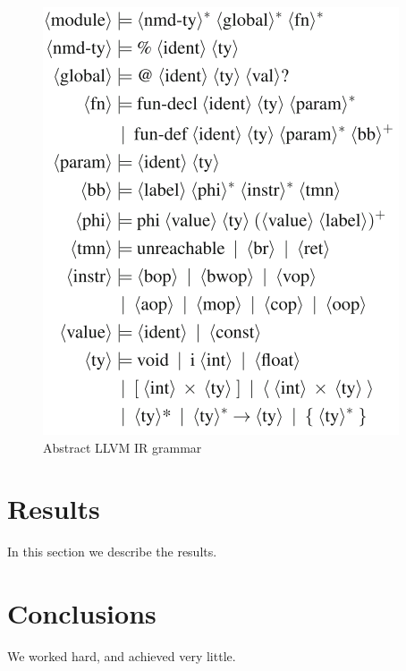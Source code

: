 \documentclass[14pt]{article}
\begin{document}
\begin{figure}[htb!]
  \begin{centering}
    \includegraphics[scale=0.5]{figures/llvm_ir_grammar}\par
  \end{centering}
  \caption{Abstract LLVM IR grammar}
  \label{fig:llvm_ir_grammar}
\end{figure}



\section{Results}\label{results}
In this section we describe the results.

\section{Conclusions}\label{conclusions}
We worked hard, and achieved very little.
\end{document}
